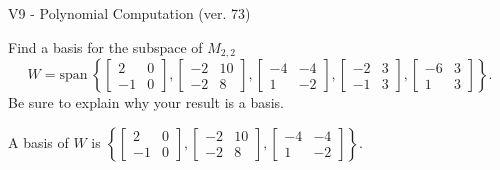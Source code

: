 \begin{exercise}
  \begin{exerciseTitle}V9 - Polynomial Computation (ver. 73)\end{exerciseTitle}
  \begin{exerciseStatement}
    Find a basis for the subspace of \(M_{2,2}\) 
\[W=\mathrm{span}\ \left\{\left[\begin{array}{cc}
2 & 0 \\
-1 & 0
\end{array}\right] , \left[\begin{array}{cc}
-2 & 10 \\
-2 & 8
\end{array}\right] , \left[\begin{array}{cc}
-4 & -4 \\
1 & -2
\end{array}\right] , \left[\begin{array}{cc}
-2 & 3 \\
-1 & 3
\end{array}\right] , \left[\begin{array}{cc}
-6 & 3 \\
1 & 3
\end{array}\right]\right\}.\]
 Be sure to explain why your result is a basis.


  \end{exerciseStatement}
  \begin{exerciseAnswer}
   A basis of \(W\) is  \(\left\{\left[\begin{array}{cc}
2 & 0 \\
-1 & 0
\end{array}\right] , \left[\begin{array}{cc}
-2 & 10 \\
-2 & 8
\end{array}\right] , \left[\begin{array}{cc}
-4 & -4 \\
1 & -2
\end{array}\right]\right\}\).
  


  \end{exerciseAnswer}
\end{exercise}